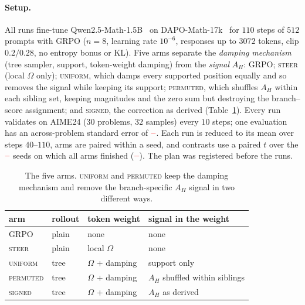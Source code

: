 \documentclass[runningheads]{llncs}
\newcommand{\AH}{A_{H}}
\newcommand{\Om}{\Omega}
\providecommand{\PENDING}{\textcolor{red}{\textbf{--}}}
\newcommand{\num}[1]{\ifcsname #1\endcsname\csname #1\endcsname\else\PENDING\fi}
\begin{document}
\paragraph{Setup.} All runs fine-tune Qwen2.5-Math-1.5B~\cite{yang2024aqwen} on
DAPO-Math-17k~\cite{yu2025dapo} for $110$ steps of $512$ prompts with GRPO ($n = 8$,
learning rate $10^{-6}$, responses up to $3072$ tokens, clip $0.2/0.28$, no entropy
bonus or KL). Five arms separate the \emph{damping mechanism} (tree sampler, support,
token-weight damping) from the \emph{signal} $\AH$: GRPO; \textsc{steer} (local $\Om$
only); \textsc{uniform}, which damps every supported position equally and so removes
the signal while keeping its support; \textsc{permuted}, which shuffles $\AH$ within
each sibling set, keeping magnitudes and the zero sum but destroying the branch--score
assignment; and \textsc{signed}, the correction as derived (Table~\ref{tab:arms}).
Every run validates on AIME24 ($30$ problems, $32$ samples) every $10$ steps; one
evaluation has an across-problem standard error of $\num{SEaime}$. Each run is reduced
to its mean over steps $40$--$110$, arms are paired within a seed, and contrasts use a
paired $t$ over the $\num{Nseedsused}$ seeds on which all arms finished
($\num{Seedset}$). The plan was registered before the runs.

\begin{table}[t]
\caption{The five arms. \textsc{uniform} and \textsc{permuted} keep the damping
mechanism and remove the branch-specific $\AH$ signal in two different ways.}
\label{tab:arms}
\centering
\setlength{\tabcolsep}{6pt}
\begin{tabular}{@{}llll@{}}
\toprule
arm & rollout & token weight & signal in the weight \\
\midrule
GRPO              & plain & none           & none \\
\textsc{steer}    & plain & local $\Om$    & none \\
\textsc{uniform}  & tree  & $\Om$ + damping & support only \\
\textsc{permuted} & tree  & $\Om$ + damping & $\AH$ shuffled within siblings \\
\textsc{signed}   & tree  & $\Om$ + damping & $\AH$ as derived \\
\bottomrule
\end{tabular}
\end{table}
\end{document}
